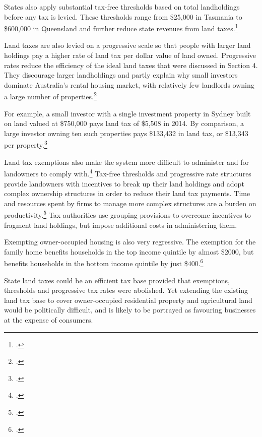States also apply substantial tax-free thresholds based on total landholdings before any tax is levied. These thresholds range from \$25,000 in Tasmania to \$600,000 in Queensland and further reduce state revenues from land taxes.\footcite[][31--33]{Treasury2014-Interstate-Comparison-Taxes1415}   

Land taxes are also levied on a progressive scale\label{paragraph:PROP-land-taxes-levied-on-progressive-scale} so that people with larger land holdings pay a higher rate of land tax per dollar value of land owned. Progressive rates reduce the efficiency of the ideal land taxes that were discussed in Section 4. They discourage larger landholdings and partly explain why small investors dominate Australia’s rental housing market, with relatively few landlords owning a large number of properties.\footcites{Berry2000}{WoodOngStewart2010}[][261]{HenryTaxReview2010}

For example, a small investor with a single investment property in Sydney built on land valued at \$750,000 pays land tax of \$5,508 in 2014. By comparison, a large investor owning ten such properties pays \$133,432 in land tax, or \$13,343 per property.\footcite[][31--33]{Treasury2014-Interstate-Comparison-Taxes1415} 

Land tax exemptions also make the system more difficult to administer and for landowners to comply with.\footcite[][261]{HenryTaxReview2010}  Tax-free thresholds and progressive rate structures provide landowners with incentives to break up their land holdings and adopt complex ownership structures in order to reduce their land tax payments. Time and resources spent by firms to manage more complex structures are a burden on productivity.\footcite[][157]{GabbitasEldridge1998}  Tax authorities use grouping provisions to overcome incentives to fragment land holdings, but impose additional costs in administering them. 

Exempting owner-occupied housing is also very regressive. The exemption for the family home benefits households in the top income quintile by almost \$2000, but benefits households in the bottom income quintile by just \$400.\footcite[][27]{KellyMaresHarrisonEtAl2013}   

State land taxes could be an efficient tax base provided that exemptions, thresholds and progressive tax rates were abolished. Yet extending the existing land tax base to cover owner-occupied residential property and agricultural land would be politically difficult, and is likely to be portrayed as favouring businesses at the expense of consumers.


